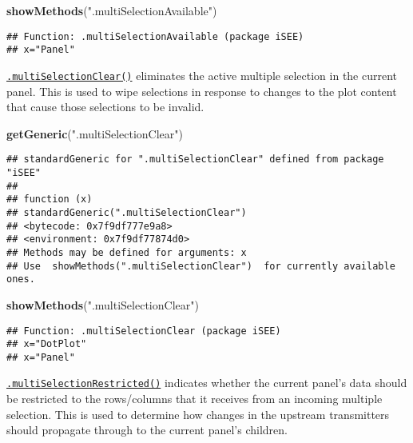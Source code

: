 \documentclass[
]{book}
\newenvironment{Shaded}{\begin{snugshade}}{\end{snugshade}}
\newcommand{\KeywordTok}[1]{\textcolor[rgb]{0.13,0.29,0.53}{\textbf{#1}}}
\newcommand{\NormalTok}[1]{#1}
\newcommand{\StringTok}[1]{\textcolor[rgb]{0.31,0.60,0.02}{#1}}
\begin{document}
\begin{Shaded}
\begin{Highlighting}[]
\KeywordTok{showMethods}\NormalTok{(}\StringTok{".multiSelectionAvailable"}\NormalTok{)}
\end{Highlighting}
\end{Shaded}

\begin{verbatim}
## Function: .multiSelectionAvailable (package iSEE)
## x="Panel"
\end{verbatim}

\href{https://isee.github.io/iSEE/reference/multi-select-generics.html}{\texttt{.multiSelectionClear()}} eliminates the active multiple selection in the current panel.
This is used to wipe selections in response to changes to the plot content that cause those selections to be invalid.

\begin{Shaded}
\begin{Highlighting}[]
\KeywordTok{getGeneric}\NormalTok{(}\StringTok{".multiSelectionClear"}\NormalTok{)}
\end{Highlighting}
\end{Shaded}

\begin{verbatim}
## standardGeneric for ".multiSelectionClear" defined from package "iSEE"
## 
## function (x) 
## standardGeneric(".multiSelectionClear")
## <bytecode: 0x7f9df777e9a8>
## <environment: 0x7f9df77874d0>
## Methods may be defined for arguments: x
## Use  showMethods(".multiSelectionClear")  for currently available ones.
\end{verbatim}

\begin{Shaded}
\begin{Highlighting}[]
\KeywordTok{showMethods}\NormalTok{(}\StringTok{".multiSelectionClear"}\NormalTok{)}
\end{Highlighting}
\end{Shaded}

\begin{verbatim}
## Function: .multiSelectionClear (package iSEE)
## x="DotPlot"
## x="Panel"
\end{verbatim}

\href{https://isee.github.io/iSEE/reference/multi-select-generics.html}{\texttt{.multiSelectionRestricted()}} indicates whether the current panel's data should be restricted to the rows/columns that it receives from an incoming multiple selection.
This is used to determine how changes in the upstream transmitters should propagate through to the current panel's children.
\end{document}
